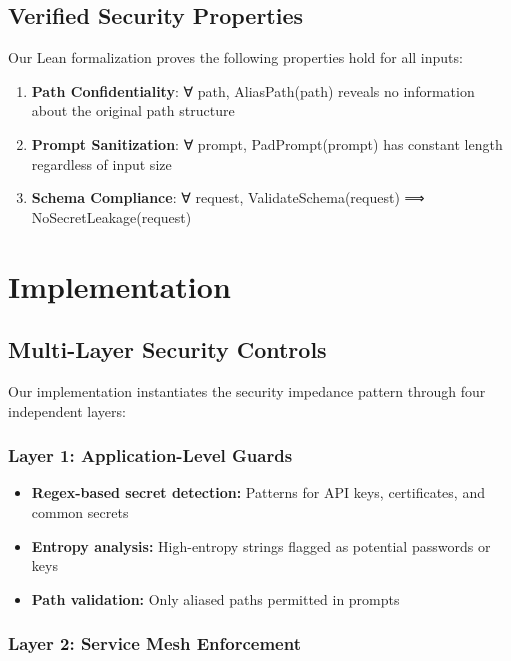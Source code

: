 \documentclass[11pt]{article}
\begin{document}
\subsection{Verified Security Properties}

Our Lean formalization proves the following properties hold for all inputs:

\begin{enumerate}
\item \textbf{Path Confidentiality}: ∀ path, AliasPath(path) reveals no information about the original path structure
\item \textbf{Prompt Sanitization}: ∀ prompt, PadPrompt(prompt) has constant length regardless of input size
\item \textbf{Schema Compliance}: ∀ request, ValidateSchema(request) ⟹ NoSecretLeakage(request)
\end{enumerate}

\section{Implementation}

\subsection{Multi-Layer Security Controls}

Our implementation instantiates the security impedance pattern through four independent layers:

\subsubsection{Layer 1: Application-Level Guards}

\begin{itemize}
\item \textbf{Regex-based secret detection:} Patterns for API keys, certificates, and common secrets
\item \textbf{Entropy analysis:} High-entropy strings flagged as potential passwords or keys
\item \textbf{Path validation:} Only aliased paths permitted in prompts
\end{itemize}

\subsubsection{Layer 2: Service Mesh Enforcement}
\end{document}
